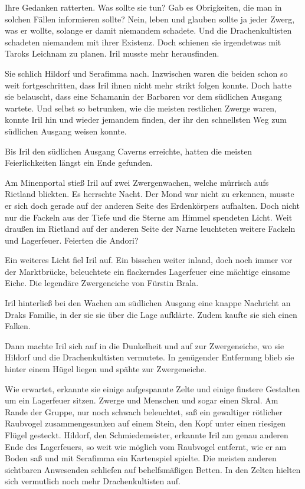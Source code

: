 Ihre Gedanken ratterten. Was sollte sie tun? Gab es Obrigkeiten, die man in solchen Fällen informieren sollte? Nein, leben und glauben sollte ja jeder Zwerg, was er wollte, solange er damit niemandem schadete. Und die Drachenkultisten schadeten niemandem mit ihrer Existenz. Doch schienen sie irgendetwas mit Taroks Leichnam zu planen. Iril musste mehr herausfinden.

Sie schlich Hildorf und Serafimma nach. Inzwischen waren die beiden schon so weit fortgeschritten, dass Iril ihnen nicht mehr strikt folgen konnte. Doch hatte sie belauscht, dass eine Schamanin der Barbaren vor dem südlichen Ausgang wartete. Und selbst so betrunken, wie die meisten restlichen Zwerge waren, konnte Iril hin und wieder jemandem finden, der ihr den schnellsten Weg zum südlichen Ausgang weisen konnte.



\trennzeichen



Bis Iril den südlichen Ausgang Caverns erreichte, hatten die meisten Feierlichkeiten längst ein Ende gefunden.

Am Minenportal stieß Iril auf zwei Zwergenwachen, welche mürrisch aufs Rietland blickten. Es herrschte Nacht. Der Mond war nicht zu erkennen, musste er sich doch gerade auf der anderen Seite des Erdenkörpers aufhalten. Doch nicht nur die Fackeln aus der Tiefe und die Sterne am Himmel spendeten Licht. Weit draußen im Rietland auf der anderen Seite der Narne leuchteten weitere Fackeln und Lagerfeuer. Feierten die Andori?

Ein weiteres Licht fiel Iril auf. Ein bisschen weiter inland, doch noch immer vor der Marktbrücke, beleuchtete ein flackerndes Lagerfeuer eine mächtige einsame Eiche. Die legendäre Zwergeneiche von Fürstin Brala.

Iril hinterließ bei den Wachen am südlichen Ausgang eine knappe Nachricht an Draks Familie, in der sie sie über die Lage aufklärte. Zudem kaufte sie sich einen Falken.

Dann machte Iril sich auf in die Dunkelheit und auf zur Zwergeneiche, wo sie Hildorf und die Drachenkultisten vermutete. In genügender Entfernung blieb sie hinter einem Hügel liegen und spähte zur Zwergeneiche.

Wie erwartet, erkannte sie einige aufgespannte Zelte und einige finstere Gestalten um ein Lagerfeuer sitzen. Zwerge und Menschen und sogar einen Skral. Am Rande der Gruppe, nur noch schwach beleuchtet, saß ein gewaltiger rötlicher Raubvogel zusammengesunken auf einem Stein, den Kopf unter einen riesigen Flügel gesteckt. Hildorf, den Schmiedemeister, erkannte Iril am genau anderen Ende des Lagerfeuers, so weit wie möglich vom Raubvogel entfernt, wie er am Boden saß und mit Serafimma ein Kartenspiel spielte. Die meisten anderen sichtbaren Anwesenden schliefen auf behelfsmäßigen Betten. In den Zelten hielten sich vermutlich noch mehr Drachenkultisten auf.

